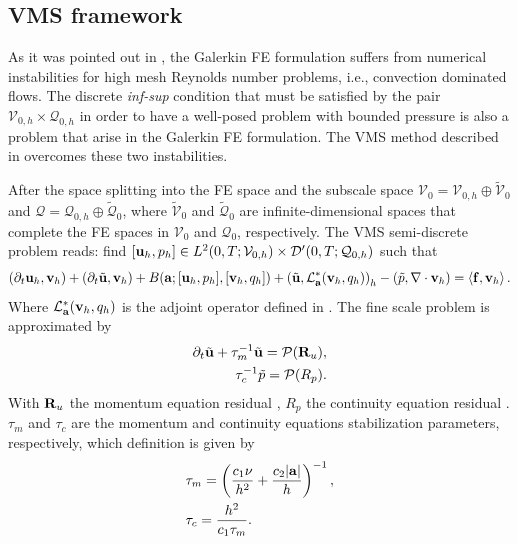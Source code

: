 \subsection{VMS framework}
\label{subsec-C4_VMS_framework}
As it was pointed out in , the Galerkin FE formulation  suffers from numerical instabilities for high mesh Reynolds number problems, i.e., convection dominated flows. The discrete \textit{inf-sup} condition that must be satisfied by the pair $\mathcal{V}_{0,h} \times\mathcal{Q}_{0,h}$ in order to have a well-posed problem with bounded pressure is also a problem that arise in the Galerkin FE formulation. The VMS method described in  overcomes these two instabilities.

After the space splitting into the FE space and the subscale space $\mathcal{V}_0=\mathcal{V}_{0,h}\oplus\widetilde{\mathcal{V}}_0$ and $\mathcal{Q}=\mathcal{Q}_{0,h}\oplus\widetilde{\mathcal{Q}}_0$, where $\widetilde{\mathcal{V}}_0$ and $\widetilde{\mathcal{Q}}_0$ are infinite-dimensional spaces that complete the FE spaces in $\mathcal{V}_0$ and $\mathcal{Q}_0$, respectively. The VMS semi-discrete problem reads: find $[{\bf u}_h,p_h]\in {L}^2(0,T;\mathcal{V}_{0,h})\times {\cal D}'(0,T;\mathcal{Q}_{0,h})$ such that
\begin{equation}
\label{eq-C4_NS_discrete}
(\partial_t{\bf u}_h,{\bf v}_h)+(\partial_t\tilde{{\bf u}},{\bf v}_h)+B({\bf a};[{\bf u}_h,p_h],[{\bf v}_h,q_h])+\left(\tilde{{\bf u}},\mathcal{L}_{{\bf a}}^*({\bf v}_h,q_h)\right)_h-\left(\tilde{p},\nabla\cdot{\bf v}_h\right)=\left<{\bf f},{\bf v}_h\right>.
\end{equation}
Where $ \mathcal{L}_{{\bf a}}^*({\bf v}_h,q_h) $ is the adjoint operator defined in . The fine scale problem is approximated by
\begin{align}
\label{eq-C4_velo_sgs}
\partial_t\tilde{{\bf u}}+\tau_m^{-1}\tilde{{\bf u}}=\mathcal{P}({\bf R}_u),\\
\label{eq-C4_press_sgs}
\tau_c^{-1}\tilde{p}=\mathcal{P}(R_p).
\end{align}
With $ {\bf R}_u $ the momentum equation residual , $ R_p $ the continuity equation residual . $ \tau_m $ and $ \tau_c $ are the momentum and continuity equations stabilization parameters, respectively, which definition is given by 
\begin{align}
\label{eq-C4_tau_m}
&\tau_m=\left(\frac{c_1\nu}{h^2}+\frac{c_2|{\bf a}|}{h}\right)^{-1},\\
\label{eq-C4_tau_c}
&\tau_c=\frac{h^2}{c_1\tau_m}.
\end{align}

